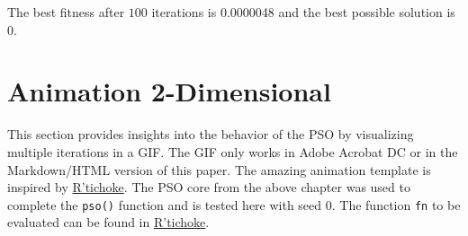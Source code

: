 \documentclass[
  oneside]{book}
\newenvironment{Shaded}{\begin{snugshade}}{\end{snugshade}}
\newcommand{\CommentTok}[1]{\textcolor[rgb]{0.56,0.35,0.01}{\textit{#1}}}
\newcommand{\ConstantTok}[1]{\textcolor[rgb]{0.00,0.00,0.00}{#1}}
\newcommand{\ControlFlowTok}[1]{\textcolor[rgb]{0.13,0.29,0.53}{\textbf{#1}}}
\newcommand{\FunctionTok}[1]{\textcolor[rgb]{0.00,0.00,0.00}{#1}}
\newcommand{\NormalTok}[1]{#1}
\newcommand{\OtherTok}[1]{\textcolor[rgb]{0.56,0.35,0.01}{#1}}
\newcommand{\SpecialCharTok}[1]{\textcolor[rgb]{0.00,0.00,0.00}{#1}}
\newcommand{\StringTok}[1]{\textcolor[rgb]{0.31,0.60,0.02}{#1}}
\begin{document}
\begin{Shaded}
\end{Shaded}

The best fitness after \(100\) iterations is 0.0000048 and the best possible solution is \(0\).

\hypertarget{animation-2-dimensional}{%
\section{Animation 2-Dimensional}\label{animation-2-dimensional}}

This section provides insights into the behavior of the PSO by visualizing multiple iterations in a GIF. The GIF only works in Adobe Acrobat DC or in the Markdown/HTML version of this paper. The amazing animation template is inspired by \href{https://www.r-bloggers.com/2021/10/how-to-build-a-basic-particle-swarm-optimiser-from-scratch-in-r/}{R'tichoke}. The PSO core from the above chapter was used to complete the \texttt{pso()} function and is tested here with seed 0. The function \texttt{fn} to be evaluated can be found in \href{https://www.r-bloggers.com/2021/10/how-to-build-a-basic-particle-swarm-optimiser-from-scratch-in-r/}{R'tichoke}.
\end{document}
